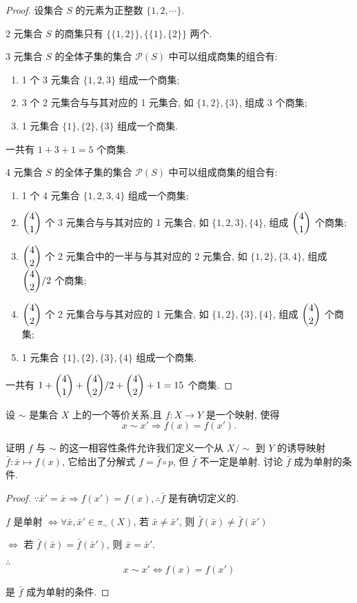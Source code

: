 \documentclass{ctexart}
\begin{document}
\begin{proof}
    设集合 $S$ 的元素为正整数 $\{1,2,\cdots\}$.

    2 元集合 $S$ 的商集只有 $\{\{1,2\}\},\{\{1\},\{2\}\}$ 两个.

    3 元集合 $S$ 的全体子集的集合 $\mathcal{P}(S)$ 中可以组成商集的组合有:
    \begin{enumerate}
        \item 1 个 3 元集合 $\{1,2,3\}$ 组成一个商集;
        \item 3 个 2 元集合与与其对应的 1 元集合, 如 $\{1,2\},\{3\}$, 组成 3 个商集;
        \item 1 元集合 $\{1\},\{2\},\{3\}$ 组成一个商集.
    \end{enumerate}

    一共有 $1+3+1=5$ 个商集.

    4 元集合 $S$ 的全体子集的集合 $\mathcal{P}(S)$ 中可以组成商集的组合有:
    \begin{enumerate}
        \item 1 个 4 元集合 $\{1,2,3,4\}$ 组成一个商集;
        \item $\dbinom{4}{1}$ 个 3 元集合与与其对应的 1 元集合, 如 $\{1,2,3\},\{4\}$, 组成 $\dbinom{4}{1}$ 个商集;
        \item $\dbinom{4}{2}$ 个 2 元集合中的一半与与其对应的 2 元集合, 如 $\{1,2\},\{3,4\}$, 组成 $\dbinom{4}{2}/2$ 个商集;
        \item $\dbinom{4}{2}$ 个 2 元集合与与其对应的 1 元集合, 如 $\{1,2\},\{3\},\{4\}$, 组成 $\dbinom{4}{2}$ 个商集;
        \item 1 元集合 $\{1\},\{2\},\{3\},\{4\}$ 组成一个商集.
    \end{enumerate}

    一共有 $1+\dbinom{4}{1}+\dbinom{4}{2}/2+\dbinom{4}{2}+1=15$ 个商集.
\end{proof}
\begin{exercise}%
    设 $\sim$ 是集合 $X$ 上的一个等价关系,且 $f:X\to Y$ 是一个映射, 使得
    \[x\sim x'\Rightarrow f(x)=f(x').\]

    证明 $f$ 与 $\sim$ 的这一相容性条件允许我们定义一个从 $X/\sim$ 到 $Y$ 的诱导映射 $\bar{f}:\bar{x}\mapsto f(x)$, 它给出了分解式 $f=\bar{f}\circ p$, 但 $\bar{f}$ 不一定是单射. 讨论 $\bar{f}$ 成为单射的条件.
\end{exercise}
\begin{proof}
    $\because\bar{x}'=\bar{x}\Rightarrow f(x')=f(x),\therefore\bar{f}$ 是有确切定义的.

    $f$ 是单射 $\Leftrightarrow\forall\bar{x},\bar{x}'\in\pi_\sim(X)$, 若 $\bar{x}\neq\bar{x}'$, 则 $\bar{f}(\bar{x})\neq\bar{f}(\bar{x}')$

    $\Leftrightarrow$ 若 $\bar{f}(\bar{x})=\bar{f}(\bar{x}')$, 则 $\bar{x}=\bar{x}'$.

    $\therefore$
    \[x\sim x'\Leftrightarrow f(x)=f(x')\]

    是 $\bar{f}$ 成为单射的条件.
\end{proof}
\end{document}
